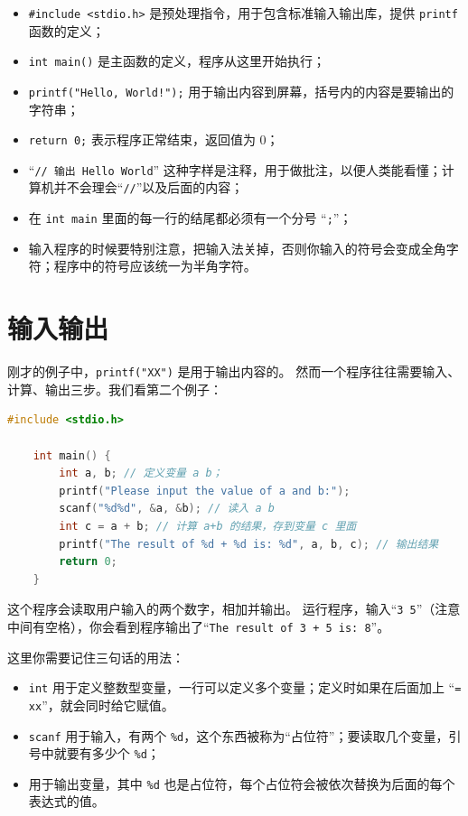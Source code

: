\documentclass[lang=cn,newtx,10pt,scheme=chinese]{elegantbook}
\begin{document}
\begin{itemize}
    \item \lstinline{#include <stdio.h>} 是预处理指令，用于包含标准输入输出库，提供 \lstinline{printf} 函数的定义；
    \item \lstinline{int main()} 是主函数的定义，程序从这里开始执行；
    \item \lstinline{printf("Hello, World!");} 用于输出内容到屏幕，括号内的内容是要输出的字符串；
    \item \lstinline{return 0;} 表示程序正常结束，返回值为 0；
    \item “\lstinline{// 输出 Hello World}” 这种字样是注释，用于做批注，以便人类能看懂；计算机并不会理会“\lstinline{//}”以及后面的内容；
    \item 在 \lstinline{int main} 里面的每一行的结尾都必须有一个分号 “\lstinline{;}”；
    \item 输入程序的时候要特别注意，把输入法关掉，否则你输入的符号会变成全角字符；程序中的符号应该统一为半角字符。
\end{itemize}

\section{输入输出}

刚才的例子中，\lstinline{printf("XX")} 是用于输出内容的。
然而一个程序往往需要输入、计算、输出三步。我们看第二个例子：

\label{sec:input-output}
\begin{lstlisting}[language=C]
    #include <stdio.h>
    
    int main() {
        int a, b; // 定义变量 a b；
        printf("Please input the value of a and b:");
        scanf("%d%d", &a, &b); // 读入 a b
        int c = a + b; // 计算 a+b 的结果，存到变量 c 里面
        printf("The result of %d + %d is: %d", a, b, c); // 输出结果
        return 0;
    }
\end{lstlisting}

这个程序会读取用户输入的两个数字，相加并输出。
运行程序，输入“\lstinline{3 5}”（注意中间有空格），你会看到程序输出了“\lstinline{The result of 3 + 5 is: 8}”。

这里你需要记住三句话的用法：

\begin{itemize}
    \item \lstinline{int} 用于定义整数型变量，一行可以定义多个变量；定义时如果在后面加上 “\lstinline{= xx}”，就会同时给它赋值。
    \item \lstinline{scanf} 用于输入，有两个 \lstinline{%d}，这个东西被称为“占位符”；要读取几个变量，引号中就要有多少个 \lstinline{%d}；
    \item {} 用于输出变量，其中 \lstinline{%d} 也是占位符，每个占位符会被依次替换为后面的每个表达式的值。
\end{itemize}
\end{document}
